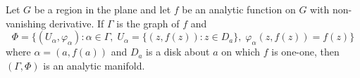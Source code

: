 Let $G$ be a region in the plane and let $f$ be an analytic function on $G$ with non-vanishing derivative. If $\Gamma$ is the graph of $f$ and
$$\Phi = \{(U_\alpha, \varphi_\alpha) : \alpha \in \Gamma,\; U_\alpha = \{(z, f(z)) : z \in D_a\},\; \varphi_\alpha(z, f(z)) = f(z)\}$$
where $\alpha = (a, f(a))$ and $D_a$ is a disk about $a$ on which $f$ is one-one, then $(\Gamma, \Phi)$ is an analytic manifold.
